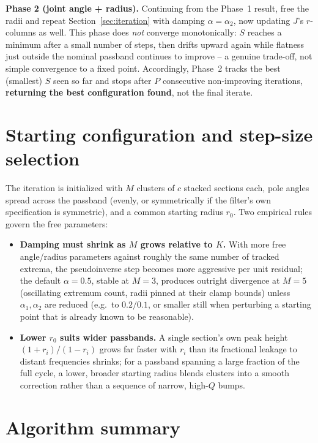 \documentclass[11pt]{article}
\begin{document}
\textbf{Phase 2 (joint angle + radius).} Continuing from the Phase~1
result, free the radii and repeat Section~\ref{sec:iteration} with
damping $\alpha = \alpha_2$, now updating $J$'s $r$-columns as well.
This phase does \emph{not} converge monotonically: $S$ reaches a minimum
after a small number of steps, then drifts upward again while flatness
just outside the nominal passband continues to improve -- a genuine
trade-off, not simple convergence to a fixed point. Accordingly, Phase~2
tracks the best (smallest) $S$ seen so far and stops after $P$
consecutive non-improving iterations, \textbf{returning the best
configuration found}, not the final iterate.

\section{Starting configuration and step-size selection}

The iteration is initialized with $M$ clusters of $c$ stacked sections
each, pole angles spread across the passband (evenly, or symmetrically
if the filter's own specification is symmetric), and a common starting
radius $r_0$. Two empirical rules govern the free parameters:

\begin{itemize}
\item \textbf{Damping must shrink as $M$ grows relative to $K$.} With
  more free angle/radius parameters against roughly the same number of
  tracked extrema, the pseudoinverse step becomes more aggressive per
  unit residual; the default $\alpha=0.5$, stable at $M=3$, produces
  outright divergence at $M=5$ (oscillating extremum count, radii
  pinned at their clamp bounds) unless $\alpha_1,\alpha_2$ are reduced
  (e.g.\ to $0.2/0.1$, or smaller still when perturbing a starting point
  that is already known to be reasonable).
\item \textbf{Lower $r_0$ suits wider passbands.} A single section's own
  peak height $(1+r_i)/(1-r_i)$ grows far faster with $r_i$ than its
  fractional leakage to distant frequencies shrinks; for a passband
  spanning a large fraction of the full cycle, a lower, broader starting
  radius blends clusters into a smooth correction rather than a
  sequence of narrow, high-$Q$ bumps.
\end{itemize}

\section{Algorithm summary}
\end{document}
